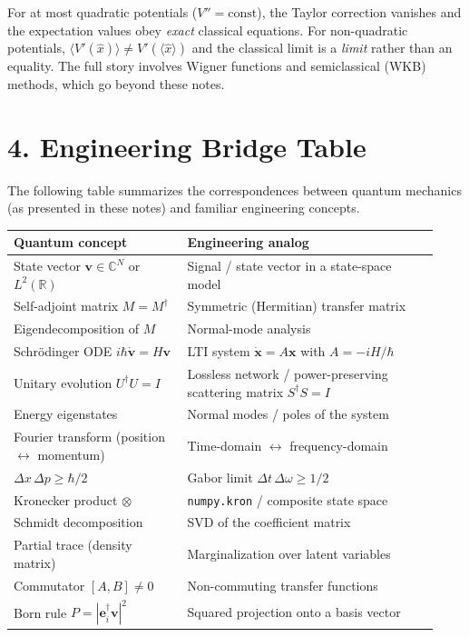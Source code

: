 \documentclass[12pt,a4paper]{article}
\begin{document}
For at most quadratic potentials ($V'' = \text{const}$), the Taylor correction vanishes and the expectation values obey \emph{exact} classical equations.  For non-quadratic potentials, $\langle V'(\hat{x})\rangle \neq V'(\langle\hat{x}\rangle)$ and the classical limit is a \emph{limit} rather than an equality.  The full story involves Wigner functions and semiclassical (WKB) methods, which go beyond these notes.

\section{4. Engineering Bridge Table}

\medskip
\noindent The following table summarizes the correspondences between quantum mechanics (as presented in these notes) and familiar engineering concepts.

\medskip
\begin{center}
\renewcommand{\arraystretch}{1.3}
\begin{tabular}{@{}p{0.38\linewidth}p{0.55\linewidth}@{}}
\toprule
\textbf{Quantum concept} & \textbf{Engineering analog} \\
\midrule
State vector $\mathbf{v} \in \mathbb{C}^N$ or $L^2(\mathbb{R})$ & Signal / state vector in a state-space model \\
Self-adjoint matrix $M = M^\dagger$ & Symmetric (Hermitian) transfer matrix \\
Eigendecomposition of $M$ & Normal-mode analysis \\
Schr\"odinger ODE $i\hbar\dot{\mathbf{v}} = H\mathbf{v}$ & LTI system $\dot{\mathbf{x}} = A\mathbf{x}$ with $A = -iH/\hbar$ \\
Unitary evolution $U^\dagger U = I$ & Lossless network / power-preserving scattering matrix $S^\dagger S = I$ \\
Energy eigenstates & Normal modes / poles of the system \\
Fourier transform (position $\leftrightarrow$ momentum) & Time-domain $\leftrightarrow$ frequency-domain \\
$\Delta x\,\Delta p \geq \hbar/2$ & Gabor limit $\Delta t\,\Delta\omega \geq 1/2$ \\
Kronecker product $\otimes$ & \texttt{numpy.kron} / composite state space \\
Schmidt decomposition & SVD of the coefficient matrix \\
Partial trace (density matrix) & Marginalization over latent variables \\
Commutator $[A,B] \neq 0$ & Non-commuting transfer functions \\
Born rule $P = |\mathbf{e}_i^\dagger\mathbf{v}|^2$ & Squared projection onto a basis vector \\
\bottomrule
\end{tabular}
\end{center}
\end{document}

